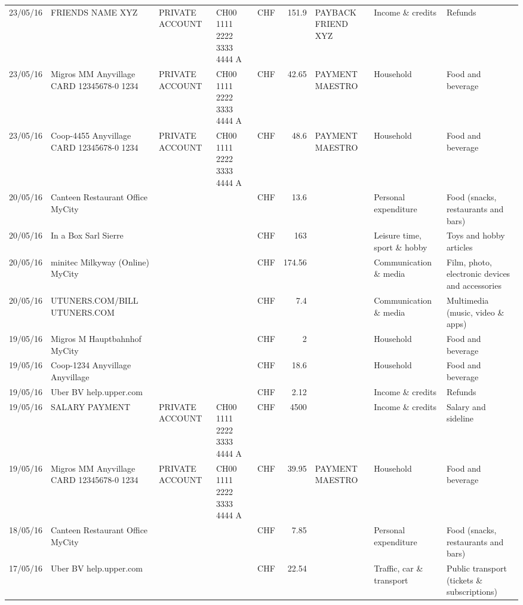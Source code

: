 \begin{landscape}
\begin{table}[h]
\begin{center}
\begin{tabular}{rllllrlll}
		23/05/16 & FRIENDS NAME XYZ & PRIVATE ACCOUNT & CH00 1111 2222 3333 4444 A & CHF   & 151.9 & PAYBACK FRIEND XYZ & Income \& credits & Refunds \\
		23/05/16 & Migros MM Anyvillage CARD 12345678-0 1234 & PRIVATE ACCOUNT & CH00 1111 2222 3333 4444 A & CHF   & 42.65 & PAYMENT MAESTRO & Household & Food and beverage \\
		23/05/16 & Coop-4455 Anyvillage CARD 12345678-0 1234 & PRIVATE ACCOUNT & CH00 1111 2222 3333 4444 A & CHF   & 48.6  & PAYMENT MAESTRO & Household & Food and beverage \\
		20/05/16 & Canteen Restaurant Office      MyCity &       &       & CHF   & 13.6  &       & Personal expenditure & Food (snacks, restaurants and bars) \\
		20/05/16 & In a Box Sarl            Sierre &       &       & CHF   & 163   &       & Leisure time, sport \& hobby & Toys and hobby articles \\
		20/05/16 & minitec Milkyway (Online) MyCity &       &       & CHF   & 174.56 &       & Communication \& media & Film, photo, electronic devices and accessories \\
		20/05/16 & UTUNERS.COM/BILL          UTUNERS.COM &       &       & CHF   & 7.4   &       & Communication \& media & Multimedia (music, video \& apps) \\
		19/05/16 & Migros M Hauptbahnhof    MyCity &       &       & CHF   & 2     &       & Household & Food and beverage \\
		19/05/16 & Coop-1234 Anyvillage    Anyvillage &       &       & CHF   & 18.6  &       & Household & Food and beverage \\
		19/05/16 & Uber BV                  help.upper.com &       &       & CHF   & 2.12  &       & Income \& credits & Refunds \\
		19/05/16 & SALARY PAYMENT & PRIVATE ACCOUNT & CH00 1111 2222 3333 4444 A & CHF   & 4500  &       & Income \& credits & Salary and sideline \\
		19/05/16 & Migros MM Anyvillage CARD 12345678-0 1234 & PRIVATE ACCOUNT & CH00 1111 2222 3333 4444 A & CHF   & 39.95 & PAYMENT MAESTRO & Household & Food and beverage \\
		18/05/16 & Canteen Restaurant Office      MyCity &       &       & CHF   & 7.85  &       & Personal expenditure & Food (snacks, restaurants and bars) \\
		17/05/16 & Uber BV                  help.upper.com &       &       & CHF   & 22.54 &       & Traffic, car \& transport & Public transport (tickets \& subscriptions) \\

\end{tabular}
\end{center}
\end{table}
\end{landscape}
